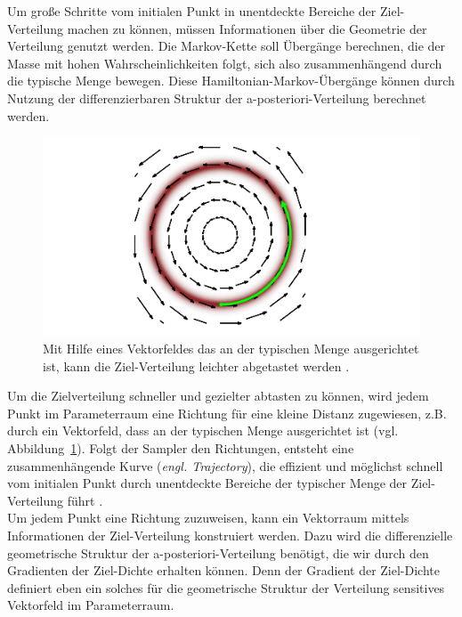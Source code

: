 \documentclass[ngerman]{ttlab-qualify}
\begin{document}
Um große Schritte vom initialen Punkt in unentdeckte Bereiche der Ziel-Verteilung machen zu können, müssen Informationen über die Geometrie der Verteilung genutzt werden. Die Markov-Kette soll Übergänge berechnen, die der Masse mit hohen Wahrscheinlichkeiten folgt, sich also zusammenhängend durch die typische Menge bewegen. Diese Hamiltonian-Markov-Übergänge können durch Nutzung der differenzierbaren Struktur der a-posteriori-Verteilung berechnet werden.\\

\begin{figure}[H]
\begin{center}
\includegraphics[scale=.9]{images/vector-field-plain-betancourt-2017}
\caption{Mit Hilfe eines Vektorfeldes das an der typischen Menge ausgerichtet ist, kann die Ziel-Verteilung leichter abgetastet werden \parencite{betancourt:2017}.}
\label{fig:vec-field-plain}
\end{center}
\end{figure}

Um die Zielverteilung schneller und gezielter abtasten zu können, wird jedem Punkt im Parameterraum eine Richtung für eine kleine Distanz zugewiesen, z.B. durch ein Vektorfeld, dass an der typischen Menge ausgerichtet ist (vgl. Abbildung~\ref{fig:vec-field-plain}). Folgt der Sampler den Richtungen, entsteht eine zusammenhängende Kurve (\textit{engl. Trajectory}), die effizient und möglichst schnell vom initialen Punkt durch unentdeckte Bereiche  der typischer Menge der Ziel-Verteilung führt \parencite{betancourt:2017}.\\

Um jedem Punkt eine Richtung zuzuweisen, kann ein Vektorraum mittels Informationen der Ziel-Verteilung konstruiert werden. Dazu wird die differenzielle geometrische Struktur der a-posteriori-Verteilung benötigt, die wir durch den Gradienten der Ziel-Dichte erhalten können. Denn der Gradient der Ziel-Dichte definiert eben ein solches für die geometrische Struktur der Verteilung sensitives Vektorfeld im Parameterraum.
\end{document}
